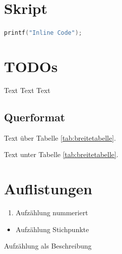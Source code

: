 \section{Skript}
\lstinline[language=c]|printf("Inline Code");|


\section{TODOs}
Text Text Text

\begin{landscape}
	\section{Querformat}
	Text über Tabelle \ref{tab:breitetabelle}.
	\begin{table}[H]
		\caption{Breites Tabellenbeispiel}
		\label{tab:breitetabelle}
		\centering
	\end{table}
	Text unter Tabelle \ref{tab:breitetabelle}.
\end{landscape}

\section{Auflistungen}
\begin{enumerate}
	\item Aufzählung nummeriert
\end{enumerate}
\begin{itemize}
	\item Aufzählung Stichpunkte
\end{itemize}
\begin{description}[style=nextline]
	\item[Label] Aufzählung als Beschreibung
\end{description}
